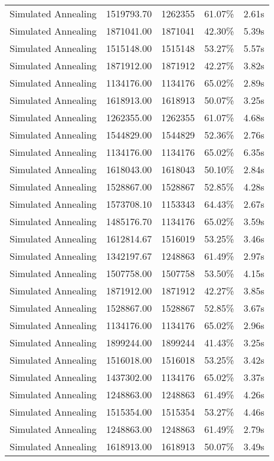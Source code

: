 \begin{table}[ht]
\begin{tabular}{|r|r|r|r|r|}
Simulated Annealing & 1519793.70 & 1262355 & 61.07\% & 2.61s\\
Simulated Annealing & 1871041.00 & 1871041 & 42.30\% & 5.39s\\
Simulated Annealing & 1515148.00 & 1515148 & 53.27\% & 5.57s\\
Simulated Annealing & 1871912.00 & 1871912 & 42.27\% & 3.82s\\
Simulated Annealing & 1134176.00 & 1134176 & 65.02\% & 2.89s\\
Simulated Annealing & 1618913.00 & 1618913 & 50.07\% & 3.25s\\
Simulated Annealing & 1262355.00 & 1262355 & 61.07\% & 4.68s\\
Simulated Annealing & 1544829.00 & 1544829 & 52.36\% & 2.76s\\
Simulated Annealing & 1134176.00 & 1134176 & 65.02\% & 6.35s\\
Simulated Annealing & 1618043.00 & 1618043 & 50.10\% & 2.84s\\
Simulated Annealing & 1528867.00 & 1528867 & 52.85\% & 4.28s\\
Simulated Annealing & 1573708.10 & 1153343 & 64.43\% & 2.67s\\
Simulated Annealing & 1485176.70 & 1134176 & 65.02\% & 3.59s\\
Simulated Annealing & 1612814.67 & 1516019 & 53.25\% & 3.46s\\
Simulated Annealing & 1342197.67 & 1248863 & 61.49\% & 2.97s\\
Simulated Annealing & 1507758.00 & 1507758 & 53.50\% & 4.15s\\
Simulated Annealing & 1871912.00 & 1871912 & 42.27\% & 3.85s\\
Simulated Annealing & 1528867.00 & 1528867 & 52.85\% & 3.67s\\
Simulated Annealing & 1134176.00 & 1134176 & 65.02\% & 2.96s\\
Simulated Annealing & 1899244.00 & 1899244 & 41.43\% & 3.25s\\
Simulated Annealing & 1516018.00 & 1516018 & 53.25\% & 3.42s\\
Simulated Annealing & 1437302.00 & 1134176 & 65.02\% & 3.37s\\
Simulated Annealing & 1248863.00 & 1248863 & 61.49\% & 4.26s\\
Simulated Annealing & 1515354.00 & 1515354 & 53.27\% & 4.46s\\
Simulated Annealing & 1248863.00 & 1248863 & 61.49\% & 2.79s\\
Simulated Annealing & 1618913.00 & 1618913 & 50.07\% & 3.49s\\

\end{tabular}
\end{table}
